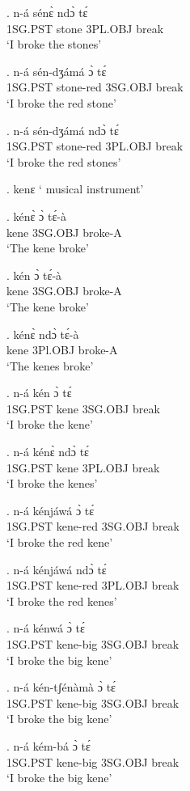 \documentclass{assets/fieldnotes}
\begin{document}
{\exg. n-á sénɛ̀ ndɔ̀ tɛ́\\
1SG.PST stone 3PL.OBJ break\\
`I broke the stones'

\exg. n-á sén-dʒámá ɔ̀ tɛ́\\
1SG.PST stone-red 3SG.OBJ break\\
`I broke the red stone'

\exg. n-á sén-dʒámá ndɔ̀ tɛ́\\
1SG.PST stone-red 3PL.OBJ break\\
`I broke the red stones'

\ex. kenɛ
` musical instrument'

\exg. kénɛ̀ ɔ̀ tɛ́-à\\
kene 3SG.OBJ broke-A\\
`The kene broke'

\exg. kén ɔ̀ tɛ́-à\\
kene 3SG.OBJ broke-A\\
`The kene broke'

\exg. kénɛ̀ ndɔ̀ tɛ́-à\\
kene 3Pl.OBJ broke-A\\
`The kenes broke'

\exg. n-á kén ɔ̀ tɛ́\\
1SG.PST kene 3SG.OBJ break\\
`I broke the kene'

\exg. n-á kénɛ̀ ndɔ̀ tɛ́\\
1SG.PST kene 3PL.OBJ break\\
`I broke the kenes'

\exg. n-á kénjáwá ɔ̀ tɛ́\\
1SG.PST kene-red 3SG.OBJ break\\
`I broke the red kene'

\exg. n-á kénjáwá ndɔ̀ tɛ́\\
1SG.PST kene-red 3PL.OBJ break\\
`I broke the red kenes'


\exg. n-á kénwá ɔ̀ tɛ́\\
1SG.PST kene-big 3SG.OBJ break\\
`I broke the big kene'

\exg. n-á kén-tʃénàmà ɔ̀ tɛ́\\
1SG.PST kene-big 3SG.OBJ break\\
`I broke the big kene'

\exg. n-á kém-bá ɔ̀ tɛ́\\
1SG.PST kene-big 3SG.OBJ break\\
`I broke the big kene'

}
\end{document}
